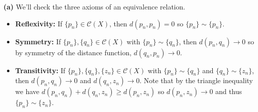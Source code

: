 \documentclass[11pt,letterpaper]{article}
\begin{document}
\begin{problem}
\end{problem}

\begin{solution}
    \textbf{(a)} We'll check the three axioms of an equivalence relation.
    \begin{itemize}
        \item \textbf{Reflexivity:} If $\{p_n\}\in \mathcal{C}(X)$, then $d(p_n, p_n)=0$ so $\{p_n\}\sim \{p_n\}$.
        \item \textbf{Symmetry:} If $\{p_n\}, \{q_n\}\in \mathcal{C}(X)$ with $\{p_n\}\sim \{q_n\}$, then $d(p_n, q_n)\to 0$ so by symmetry of the distance function, $d(q_n, p_n)\to 0$. 
        \item \textbf{Transitivity:} If $\{p_n\},\{q_n\},\{z_n\}\in \mathcal{C}(X)$ with $\{p_n\}\sim \{q_n\}$ and $\{q_n\}\sim \{z_n\}$, then $d(p_n, q_n)\to 0$ and $d(q_n, z_n)\to 0$. Note that by the triangle inequality we have $d(p_n, q_n)+d(q_n, z_n)\geq d(p_n, z_n)$ so $d(p_n, z_n)\to 0$ and thus $\{p_n\}\sim \{z_n\}$.  
    \end{itemize}
    

\end{solution}
\end{document}
